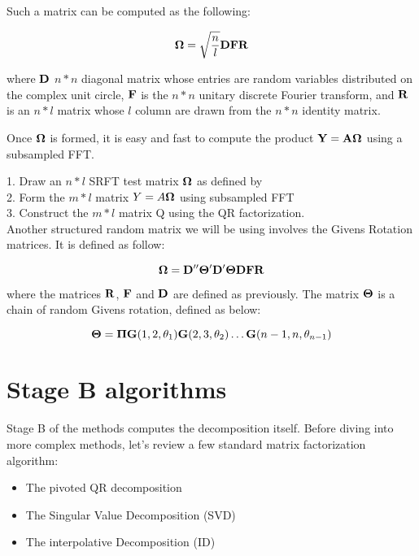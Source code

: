 \documentclass[onecolumn,12pt]{article}
\begin{document}
Such a matrix can be computed as the following:

\begin{equation}
\label{srft}
\bold{\Omega} = \sqrt{\frac{n}{l}}\bold{DFR}
\end{equation}

where $\bold{D}$ $n*n$ diagonal matrix whose entries are random variables
distributed on the complex unit circle, $\bold{F}$ is the $n*n$ unitary
discrete Fourier transform, and $\bold{R}$ is an $n*l$ matrix whose $l$ column
are drawn from the $n*n$ identity matrix.

Once $\bold{\Omega}$ is formed, it is easy and fast to compute the product
$\bold{Y} = \bold{A\Omega}$ using a subsampled FFT.

1. Draw an $n * l$ SRFT test matrix $\bold{\Omega}$ as defined by \\
2. Form the $m * l$ matrix $Y = A \bold{\Omega}$ using subsampled FFT \\
3. Construct the $m *l$ matrix Q using the QR factorization. \\

Another structured random matrix we will be using involves the Givens Rotation
matrices. It is defined as follow:

\begin{equation}
\label{gsrft}
\bold{\Omega} = \bold{D}''\bold{\Theta}' \bold{D}' \bold{\Theta} \bold{D}
\bold{F} \bold{R}
\end{equation}

where the matrices $\bold{R}$, $\bold{F}$ and $\bold{D}$ are defined as previously.
The matrix $\bold{\Theta}$ is a chain of random Givens rotation, defined as
below:

\begin{equation}
\label{givens_rotation}
\bold{\Theta} = \bold{\Pi} \bold{G}(1, 2, \theta_1) \bold{G}(2, 3, \theta_2) \dots
\bold{G}(n - 1, n, \theta_{n-1})
\end{equation}


\section{Stage B algorithms}

Stage B of the methods computes the decomposition itself. Before diving into
more complex methods, let's review a few standard matrix factorization
algorithm:

\begin{itemize}
\item The pivoted QR decomposition
\item The Singular Value Decomposition (SVD)
\item The interpolative Decomposition (ID)
\end{itemize}
\end{document}
